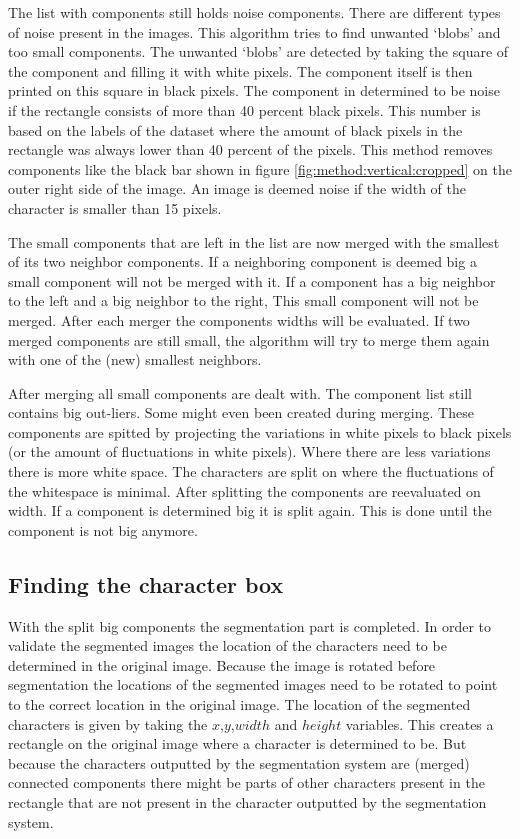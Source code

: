 The list with components still holds noise components. There are different types of noise present in the images. This algorithm tries to find unwanted `blobs' and too small components. The unwanted `blobs' are detected by taking the square of the component and filling it with white pixels. The component itself is then printed on this square in black pixels. The component in determined to be noise if the rectangle consists of more than 40 percent black pixels. This number is based on the labels of the dataset where the amount of black pixels in the rectangle was always lower than 40 percent of the pixels. This method removes components like the black bar shown in figure \ref{fig:method:vertical:cropped} on the outer right side of the image. An image is deemed noise if the width of the character is smaller than 15 pixels. 

The small components that are left in the list are now merged with the smallest of its two neighbor components. If a neighboring component is deemed big a small component will not be merged with it. If a component has a big neighbor to the left and a big neighbor to the right, This small component will not be merged. After each merger the components widths will be evaluated. If two merged components are still small, the algorithm will try to merge them again with one of the (new) smallest neighbors.

After merging all small components are dealt with. The component list still contains big out-liers. Some might even been created during merging. These components are spitted by projecting the variations in white pixels to black pixels (or the amount of fluctuations in white pixels). Where there are less variations there is more white space. The characters are split on where the fluctuations of the whitespace is minimal. After splitting the components are reevaluated on width. If a component is determined big it is split again. This is done until the component is not big anymore.


\subsection{Finding the character box}

With the split big components the segmentation part is completed. In order to validate the segmented images the location of the characters need to be determined in the original image. Because the image is rotated before segmentation the locations of the segmented images need to be rotated to point to the correct location in the original image. The location of the segmented characters is given by taking the $x$,$y$,$width$ and $height$ variables. This creates a rectangle on the original image where a character is determined to be. But because the characters outputted by the segmentation system are (merged) connected components there might be parts of other characters present in the rectangle that are not present in the character outputted by the segmentation system.

